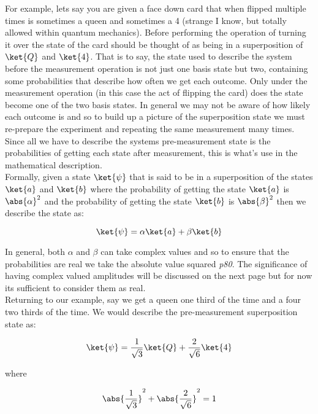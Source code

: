 For example, lets say you are given a face down card that when flipped multiple times is sometimes a queen and sometimes a 4 (strange I know, but totally allowed within quantum mechanics). Before performing the operation of turning it over the state of the card should be thought of as being in a superposition of $\ket{Q}$ and $\ket{4}$. That is to say, the state used to describe the system before the measurement operation is not just one basis state but two, containing some probabilities that describe how often we get each outcome. Only under the measurement operation (in this case the act of flipping the card) does the state become one of the two basis states. In general we may not be aware of how likely each outcome is and so to build up a picture of the superposition state we must re-prepare the experiment and repeating the same measurement many times. Since all we have to describe the systems pre-measurement state is the probabilities of getting each state after measurement, this is what's use in the mathematical description.\\

Formally, given a state $\ket{\psi}$ that is said to be in a superposition of the states $\ket{a}$ and $\ket{b}$ where the probability of getting the state $\ket{a}$ is $\abs{\alpha}^{2}$ and the probability of getting the state $\ket{b}$ is $\abs{\beta}^{2}$ then we describe the state as:

\begin{equation}
\ket{\psi} = \alpha \ket{a} + \beta \ket{b}
\end{equation}

In general, both $\alpha$ and $\beta$ can take complex values and so to ensure that the probabilities are real we take the absolute value squared \cite{nielsen_chuang_2010} \textit{p80}. The significance of having complex valued amplitudes will be discussed on the next page but for now its sufficient to consider them as real.\\

Returning to our example, say we get a queen one third of the time and a four two thirds of the time. We would describe the pre-measurement superposition state as:

\begin{equation}
\ket{\psi} = \frac{1}{\sqrt{3}} \ket{Q} + \frac{2}{\sqrt{6}}  \ket{4}
\end{equation}

where

\begin{equation}
\abs{\frac{1}{\sqrt{3}}}^{2}+ \abs{\frac{2}{\sqrt{6}}}^{2} =1
\end{equation}

